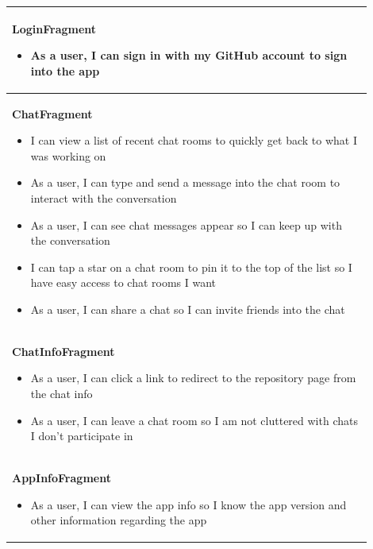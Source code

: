 \documentclass{report}
\begin{document}
\begin{center}
    \begin{tabular}{ | p{0.9\linewidth} |}
        \hline
        \textbf{LoginFragment} \begin{itemize}
                                   \item As a user, I can sign in with my GitHub account to sign into the app
                               \end{itemize}                                                       \\
        \hline
        \textbf{ChatFragment} \begin{itemize}
                                  \item I can view a list of recent chat rooms to quickly get back to what I was working on
                                  \item As a user, I can type and send a message into the chat room to interact with the conversation
                                  \item As a user, I can see chat messages appear so I can keep up with the conversation
                                  \item I can tap a star on a chat room to pin it to the top of the list so I have easy access to chat rooms I want
                                  \item As a user, I can share a chat so I can invite friends into the chat
                              \end{itemize}                 \\
        \hline
        \textbf{ChatInfoFragment} \begin{itemize}
                                      \item As a user, I can click a link to redirect to the repository page from the chat info
                                      \item As a user, I can leave a chat room so I am not cluttered with chats I don't participate in
                                  \end{itemize}                                     \\
        \hline
        \textbf{AppInfoFragment} \begin{itemize}
                                     \item As a user, I can view the app info so I know the app version and other information regarding the app
                                 \end{itemize}                     \\

\end{tabular}
\end{center}
\end{document}
